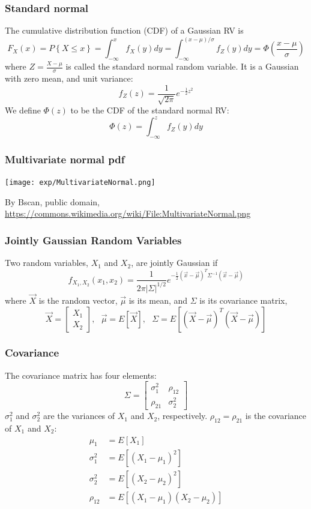 \documentclass{beamer}
\begin{document}
\begin{frame}
  \frametitle{Standard normal}

  The cumulative distribution function (CDF) of a Gaussian RV is
  \[
  F_X(x)=P\left\{X\le x\right\}
  = \int_{-\infty}^x f_X(y)dy
  = \int_{-\infty}^{(x-\mu)/\sigma} f_Z(y)dy
  = \Phi\left(\frac{x-\mu}{\sigma}\right)
  \]
  where $Z=\frac{X-\mu}{\sigma}$ is called the standard normal random
  variable.  It  is a Gaussian with zero mean, and unit variance:
  \[
  f_Z(z) = \frac{1}{\sqrt{2\pi}}e^{-\frac{1}{2}z^2}
  \]
  We define $\Phi(z)$  to be the CDF of the standard normal RV:
  \[
  \Phi(z) =  \int_{-\infty}^{z} f_Z(y)dy
  \]
\end{frame}

\begin{frame}
  \frametitle{Multivariate normal pdf}
  \centerline{\texttt{[image: exp/MultivariateNormal.png]}}
  \begin{tiny}
    By Bscan, public domain,
    \url{https://commons.wikimedia.org/wiki/File:MultivariateNormal.png}
  \end{tiny}
\end{frame}

\begin{frame}
  \frametitle{Jointly Gaussian Random Variables}

  Two random variables, $X_1$ and $X_2$, are jointly Gaussian if
  \[
  f_{X_1,X_2}(x_1,x_2) = \frac{1}{2\pi|\Sigma|^{1/2}}
  e^{-\frac{1}{2}(\vec{x}-\vec\mu)^T\Sigma^{-1}(\vec{x}-\vec\mu)}
  \]
  where $\vec{X}$ is the random vector, $\vec\mu$ is its mean, and $\Sigma$ is its
  covariance matrix,
  \[
  \vec{X}=\left[\begin{array}{c}X_1\\X_2\end{array}\right],~~~
  \vec\mu=E\left[\vec{X}\right],~~~
  \Sigma = E\left[(\vec{X}-\vec\mu)^T(\vec{X}-\vec\mu)\right]
  \]
\end{frame}

\begin{frame}
  \frametitle{Covariance}
  The covariance matrix has four elements:
  \[
  \Sigma = \left[\begin{array}{cc}\sigma_1^2 & \rho_{12} \\\rho_{21} & \sigma_2^2\end{array}\right]
  \]
  $\sigma_1^2$ and $\sigma_2^2$ are the variances of $X_1$ and $X_2$, respectively.
  $\rho_{12}=\rho_{21}$ is the covariance of $X_1$ and $X_2$:
  \begin{align*}
    \mu_1 & = E[X_1]\\
    \sigma_1^2 &= E\left[(X_1-\mu_1)^2\right]\\
    \sigma_2^2 &= E\left[(X_2-\mu_2)^2\right]\\
    \rho_{12} &= E\left[(X_1-\mu_1)(X_2-\mu_2)\right]
  \end{align*}
\end{frame}
\end{document}
